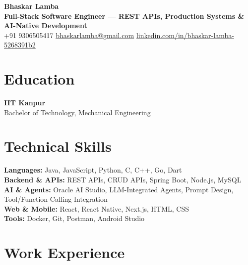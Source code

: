 \documentclass[10pt,a4paper]{article}
\newcommand{\skillCategory}[2]{\textbf{#1:} #2}
\begin{document}
\begin{center}
    {\LARGE\bfseries Bhaskar Lamba}\\[4pt]
    {\small\color{primary}\bfseries Full-Stack Software Engineer --- REST APIs, Production Systems \& AI-Native Development}\\[3pt]
    \small
    +91 9306505417 \quad\textbar\quad
    \href{mailto:bhaskarlamba@gmail.com}{bhaskarlamba@gmail.com} \quad\textbar\quad
    \href{https://www.linkedin.com/in/bhaskar-lamba-5268391b2/}{linkedin.com/in/bhaskar-lamba-5268391b2}
\end{center}
\vspace{6pt}

\section{Education}
\small
\textbf{IIT Kanpur} \hfill {}\\
Bachelor of Technology, Mechanical Engineering

\section{Technical Skills}
\small
\skillCategory{Languages}{Java, JavaScript, Python, C, C++, Go, Dart}\\[1pt]
\skillCategory{Backend \& APIs}{REST APIs, CRUD APIs, Spring Boot, Node.js, MySQL}\\[1pt]
\skillCategory{AI \& Agents}{Oracle AI Studio, LLM-Integrated Agents, Prompt Design, Tool/Function-Calling Integration}\\[1pt]
\skillCategory{Web \& Mobile}{React, React Native, Next.js, HTML, CSS}\\[1pt]
\skillCategory{Tools}{Docker, Git, Postman, Android Studio}

\section{Work Experience}
\small
\end{document}
